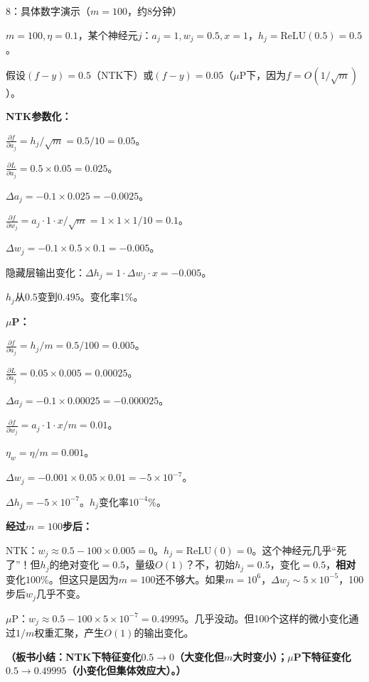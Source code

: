 \documentclass[11pt,a4paper]{article}
\begin{document}
\begin{handcalc}{8：具体数字演示（$m=100$，约8分钟）}

$m=100, \eta=0.1$，某个神经元$j$：$a_j=1, w_j=0.5, x=1$，$h_j=\text{ReLU}(0.5)=0.5$。

假设$(f-y)=0.5$（NTK下）或$(f-y)=0.05$（$\mu$P下，因为$f=O(1/\sqrt{m})$）。

\tcblower

\textbf{NTK参数化：}

$\frac{\partial f}{\partial a_j} = h_j/\sqrt{m} = 0.5/10 = 0.05$。

$\frac{\partial L}{\partial a_j} = 0.5\times 0.05 = 0.025$。

$\Delta a_j = -0.1\times 0.025 = -0.0025$。

$\frac{\partial f}{\partial w_j} = a_j\cdot 1\cdot x/\sqrt{m} = 1\times 1\times 1/10 = 0.1$。

$\Delta w_j = -0.1\times 0.5\times 0.1 = -0.005$。

隐藏层输出变化：$\Delta h_j = 1\cdot\Delta w_j\cdot x = -0.005$。

$h_j$从$0.5$变到$0.495$。变化率$1\%$。

\bigskip
\textbf{$\mu$P：}

$\frac{\partial f}{\partial a_j} = h_j/m = 0.5/100 = 0.005$。

$\frac{\partial L}{\partial a_j} = 0.05\times 0.005 = 0.00025$。

$\Delta a_j = -0.1\times 0.00025 = -0.000025$。

$\frac{\partial f}{\partial w_j} = a_j\cdot 1\cdot x/m = 0.01$。

$\eta_w = \eta/m = 0.001$。

$\Delta w_j = -0.001\times 0.05\times 0.01 = -5\times 10^{-7}$。

$\Delta h_j = -5\times 10^{-7}$。$h_j$变化率$10^{-4}\%$。

\bigskip
\textbf{经过$m=100$步后：}

NTK：$w_j\approx 0.5-100\times 0.005 = 0$。$h_j = \text{ReLU}(0) = 0$。这个神经元几乎``死了''！但$h_j$的绝对变化$=0.5$，量级$O(1)$？不，初始$h_j=0.5$，变化$=0.5$，\textbf{相对}变化$100\%$。但这只是因为$m=100$还不够大。如果$m=10^6$，$\Delta w_j\sim 5\times 10^{-5}$，100步后$w_j$几乎不变。

$\mu$P：$w_j\approx 0.5 - 100\times 5\times 10^{-7} = 0.49995$。几乎没动。但100个这样的微小变化通过$1/m$权重汇聚，产生$O(1)$的输出变化。

\textbf{（板书小结：NTK下特征变化$0.5\to 0$（大变化但$m$大时变小）；$\mu$P下特征变化$0.5\to 0.49995$（小变化但集体效应大）。）}
\end{handcalc}
\end{document}

